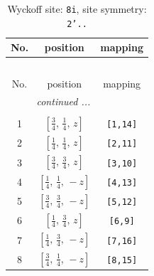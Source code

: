 \documentclass[fleqn,8pt]{jsarticle}
\begin{document}
\renewcommand{\arraystretch}{1.2}
\begin{longtable}{ccc}
\caption{Wyckoff site: {\tt 8i}, site symmetry: {\tt 2'..}}
 \\
 \hline \hline
No. & position & mapping \\ \hline \endfirsthead

\multicolumn{2}{l}{\tablename\ \thetable{}} \\
 \hline \hline
No. & position & mapping \\ \hline \endhead

 \hline \hline
\multicolumn{2}{r}{\footnotesize\it continued ...} \\ \endfoot

 \hline \hline
\multicolumn{2}{r}{} \\ \endlastfoot

1 & $\left[ \frac{3}{4},\, \frac{1}{4},\, z \right]$ & {\tt [1,14]} \\ \hline
2 & $\left[ \frac{1}{4},\, \frac{1}{4},\, z \right]$ & {\tt [2,11]} \\ \hline
3 & $\left[ \frac{3}{4},\, \frac{3}{4},\, z \right]$ & {\tt [3,10]} \\ \hline
4 & $\left[ \frac{1}{4},\, \frac{1}{4},\, - z \right]$ & {\tt [4,13]} \\ \hline
5 & $\left[ \frac{3}{4},\, \frac{3}{4},\, - z \right]$ & {\tt [5,12]} \\ \hline
6 & $\left[ \frac{1}{4},\, \frac{3}{4},\, z \right]$ & {\tt [6,9]} \\ \hline
7 & $\left[ \frac{1}{4},\, \frac{3}{4},\, - z \right]$ & {\tt [7,16]} \\ \hline
8 & $\left[ \frac{3}{4},\, \frac{1}{4},\, - z \right]$ & {\tt [8,15]} \\
\end{longtable}
\renewcommand{\arraystretch}{1.2}
\end{document}
